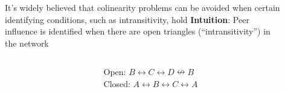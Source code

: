 \documentclass[final]{beamer}
\newlength{\sepwidth}
\newlength{\colwidth}
\newcommand{\separatorcolumn}{\begin{column}{\sepwidth}\end{column}}
\begin{document}
\begin{frame}[t]
\begin{columns}[t]
\begin{column}{\colwidth}
\begin{block}{It's widely believed that colinearity problems can be avoided when certain identifying conditions, such as intransitivity, hold}
                \textbf{Intuition}: Peer influence is identified when there are \textcolor{Mahogany}{open triangles} (``intransitivity'') in the network
                \vspace{8mm}
                \begin{columns}
                    \begin{column}{0.5\textwidth}
                        \centering
                    \end{column}
                    \begin{column}{0.5\textwidth}
                        \centering
                        Open: \textcolor{Mahogany}{$B \leftrightarrow C \leftrightarrow D \nleftrightarrow B$} \\
                        Closed: $A \leftrightarrow B \leftrightarrow C \leftrightarrow A$
                    \end{column}
                \end{columns}
            \end{block}

        \end{column}
        \separatorcolumn
        \begin{column}{\colwidth}


\end{column}
\end{columns}
\end{frame}
\end{document}
